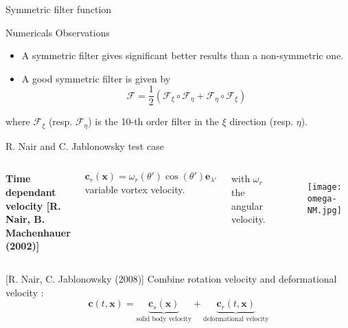 \documentclass[11pt]{beamer}
\begin{document}
\begin{frame}{Symmetric filter function}
\begin{block}{Numericals Observations}
\begin{itemize}
\item A symmetric filter gives significant better results than a non-symmetric one.
\item A good symmetric filter is given by
\begin{equation}
\mathcal{F} = \dfrac{1}{2} \left( \mathcal{F}_{\xi} \circ \mathcal{F}_{\eta} + \mathcal{F}_{\eta} \circ \mathcal{F}_{\xi} \right)
\end{equation}
\end{itemize}

where $\mathcal{F}_{\xi}$ (resp. $\mathcal{F}_{\eta}$) is the 10-th order filter in the $\xi$ direction (resp. $\eta$).

\end{block}
\end{frame}


\begin{frame}{R. Nair and C. Jablonowsky test case}
\begin{columns}
\textbf{Time dependant velocity [R. Nair, B. Machenhauer (2002)]}
\vspace{0.4cm}

$\mathbf{c}_r(\mathbf{x}) = \omega_r (\theta') \cos ( \theta') \mathbf{e}_{\lambda'}$ variable vortex velocity.
\vspace{0.25cm}

with $\omega_r$ the angular velocity.

\begin{figure}
\texttt{[image: omega-NM.jpg]}
\end{figure}
\end{columns}

\begin{block}{[R. Nair, C. Jablonowsky (2008)]}
Combine rotation velocity and deformational velocity :
$$\mathbf{c}(t, \mathbf{x}) = \underbrace{\mathbf{c}_s ( \mathbf{x} )}_{\text{solid body velocity}} + \underbrace{\mathbf{c}_r (t, \mathbf{x})}_{\text{deformational velocity}}$$
\end{block}

\end{frame}
\end{document}
